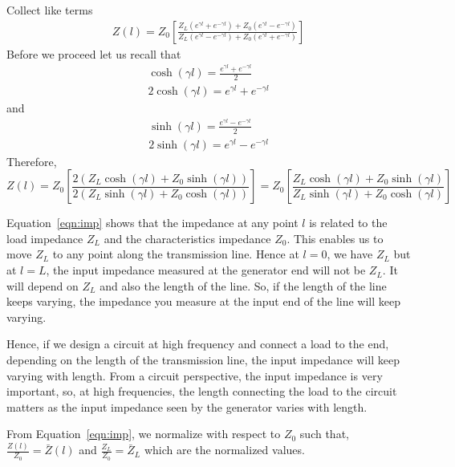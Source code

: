 Collect like terms
\begin{align*}
Z(l) = Z_0 \left[\frac{Z_L(e^{\gamma l} + e^{-\gamma l}) + Z_0(e^{\gamma l} - e^{-\gamma l})}{Z_L (e^{\gamma l} - e^{-\gamma l}) + Z_0(e^{\gamma l} + e^{-\gamma l})}\right]
\end{align*}
Before we proceed let us recall that 
\begin{align*}
\cosh(\gamma l) = \frac{e^{\gamma l} + e^{-\gamma l}}{2}\\
2\cosh(\gamma l) = e^{\gamma l} + e^{-\gamma l}
\end{align*}
 and
\begin{align*}
\sinh(\gamma l) = \frac{e^{\gamma l} - e^{-\gamma l}}{2}\\
2\sinh(\gamma l) = e^{\gamma l} - e^{-\gamma l}
\end{align*}
Therefore,
\begin{dmath}
Z(l) = Z_0\left[\frac{2(Z_L\cosh(\gamma l) + Z_0\sinh(\gamma l))}{2(Z_L\sinh(\gamma l) + Z_0\cosh(\gamma l))}\right]
= Z_0\left[\frac{Z_L\cosh(\gamma l) + Z_0\sinh(\gamma l)}{Z_L\sinh(\gamma l) + Z_0\cosh(\gamma l)}\right]
\label{eqn:imp}
\end{dmath}

Equation~\eqref{eqn:imp} shows that the impedance at any point $l$ is related to the load impedance $Z_L$ and the characteristics impedance $Z_0$. This enables us to move $Z_L$ to any point along the transmission line. Hence at $l = 0$, we have $Z_L$ but at $l = L$, the input impedance measured at the generator end will not be $Z_L$. It will depend on $Z_L$ and also the length of the line. So, if the length of the line keeps varying, the impedance you measure at the input end of the line will keep varying. 

Hence, if we design a circuit at high frequency and connect a load to the end, depending on the length of the transmission line, the input impedance will keep varying with length. From a circuit perspective, the input impedance is very important, so, at high frequencies, the length connecting the load to the circuit matters as the input impedance seen by the generator varies with length.

From Equation~\ref{eqn:imp}, we normalize with respect to $Z_0$ such that,
$\frac{Z(l)}{Z_0} = \bar{Z}(l)$ and $\frac{Z_L}{Z_0} =\bar{Z}_L$ which are the normalized values.

